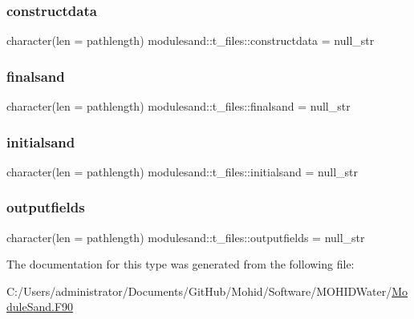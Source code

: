 \subsubsection{\texorpdfstring{constructdata}{constructdata}}
{\footnotesize\ttfamily character(len = pathlength) modulesand\+::t\+\_\+files\+::constructdata = null\+\_\+str\hspace{0.3cm}{\ttfamily [private]}}

\mbox{\label{structmodulesand_1_1t__files_a32dc1ab7a0679ad7108bb715411e11f3}} 
\subsubsection{\texorpdfstring{finalsand}{finalsand}}
{\footnotesize\ttfamily character(len = pathlength) modulesand\+::t\+\_\+files\+::finalsand = null\+\_\+str\hspace{0.3cm}{\ttfamily [private]}}

\mbox{\label{structmodulesand_1_1t__files_aecbc7380570ce33bfd8e84ab6b8d240b}} 
\subsubsection{\texorpdfstring{initialsand}{initialsand}}
{\footnotesize\ttfamily character(len = pathlength) modulesand\+::t\+\_\+files\+::initialsand = null\+\_\+str\hspace{0.3cm}{\ttfamily [private]}}

\mbox{\label{structmodulesand_1_1t__files_ab8584b56632f78a3c879814e2757816f}} 
\subsubsection{\texorpdfstring{outputfields}{outputfields}}
{\footnotesize\ttfamily character(len = pathlength) modulesand\+::t\+\_\+files\+::outputfields = null\+\_\+str\hspace{0.3cm}{\ttfamily [private]}}



The documentation for this type was generated from the following file\+:\begin{DoxyCompactItemize}
\item 
C\+:/\+Users/administrator/\+Documents/\+Git\+Hub/\+Mohid/\+Software/\+M\+O\+H\+I\+D\+Water/\mbox{\hyperlink{_module_sand_8_f90}{Module\+Sand.\+F90}}\end{DoxyCompactItemize}
